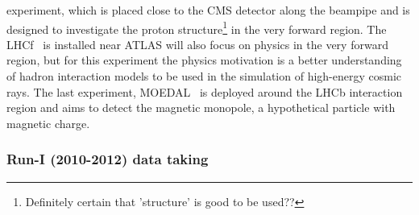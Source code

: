 experiment, which is placed close to the CMS detector along the beampipe and is designed to investigate the proton structure\footnote{Definitely certain that 'structure' is good to be used??} in the very forward region. The LHCf~\cite{} %
is installed near ATLAS will also focus on physics in the very forward region, but for this experiment the physics motivation is a better understanding of hadron interaction models to be used in the simulation of high-energy cosmic rays.
The last experiment, MOEDAL~\cite{} %
is deployed around the LHCb interaction region and aims to detect the magnetic monopole, a hypothetical particle with magnetic charge.

\subsubsection{Run-I (2010-2012) data taking}

